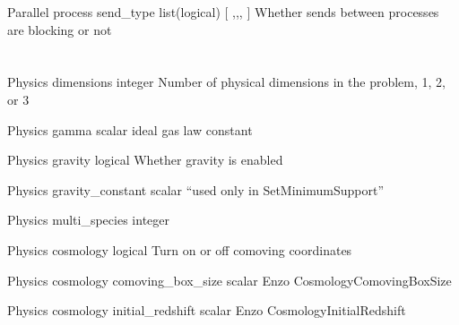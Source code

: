 \documentclass{book}
\begin{document}
\Parameter
{Parallel}
{process}
{send\_type}
{list(logical)}
{ [ ,,, ]}
{ Whether sends between processes are blocking or not}
{}
{}

\section{}

 	 	 	 	
\Parameter
{Physics}
{}
{dimensions}
{integer}
{}
{Number of physical dimensions in the problem, 1, 2, or 3}
{}
{}

\Parameter
{Physics}
{}
{gamma}
{scalar}
{}
{ideal gas law constant}
{}
{}

\Parameter
{Physics}
{}
{gravity}
{logical}
{}
{Whether gravity is enabled}
{}
{}

\Parameter
{Physics}
{}
{gravity\_constant}
{scalar}
{}
{``used only in SetMinimumSupport''}
{}
{}

\Parameter
{Physics}
{}
{multi\_species}
{integer}
{}
{}
{}
{}

\Parameter
{Physics}
{}
{cosmology}
{logical}
{}
{Turn on or off comoving coordinates}
{}
{}

\Parameter
{Physics}
{cosmology}
{comoving\_box\_size}
{scalar}
{}
{Enzo CosmologyComovingBoxSize}
{}
{}
 	 	 	 	
\Parameter
{Physics}
{cosmology}
{initial\_redshift}
{scalar}
{}
{Enzo CosmologyInitialRedshift}
{}
{}
 		 	 	
\end{document}
